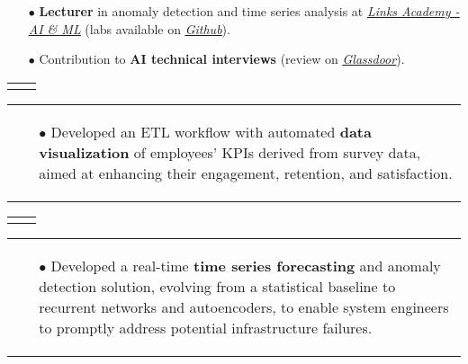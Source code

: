 \documentclass[11pt,a4paper,sans,english]{moderncv}
\makeatletter
\renewcommand*{\cventry}[6][.25em]{%
	\vspace{1.5mm}%
	\begin{tabular*}{\textwidth}{@{\extracolsep{\fill}}ll}%
		\ifthenelse{\equal{#3}{}}{}{\textbf{#3}} &
		\ifthenelse{\equal{#2}{}}{}{#4 #6 #2}\\%
	\end{tabular*}%
	\par\addvspace{#1}}
\newcommand*{\mycvitem}[2][.25em]{%
	\vspace{-.25em}%
	\begin{tabular}{@{}p{\textwidth}@{}}%
		\small#2%
	\end{tabular}%
	\par\addvspace{-0.7em}}
\newcommand*{\cvtag}[1]{%
	\textcolor{lightgray!50!black}{\fbox{\mathstrut\scriptsize\textsf{\textbf{#1}}}}}
\makeatother
\begin{document}
{\begin{itemize}
			\item[$\bullet$] \textbf{Lecturer} in anomaly detection  and time series analysis at \href{https://academy.linksmt.it/corso-di-formazione-post-laurea-artificial-intelligence-machine-learning/}{\textit{\underline{Links Academy - AI \& ML}}} (labs available on \href{https://github.com/francesco-s/Links-Academy---Anomaly-Detection-Time-series-analysis}{\textit{\underline{Github}}}).
			\item[$\bullet$] Contribution to \textbf{AI technical interviews} (review on \href{https://www.glassdoor.it/Colloquio/Links-Management-and-Technology-Colloquio-RVW82686296.htm}{\textit{\underline{Glassdoor}}}).
	\end{itemize}}
	\vspace*{.25cm}
	
	\cventry{\scalebox{0.9}{\faCalendar\ 10/2022--02/2023}}{Artificial Intelligence and Data - Analyst}{\scalebox{0.9}{\faBuilding\ \href{https://www2.deloitte.com}{\textit{Deloitte}}}}{}{\scalebox{0.9}{\faMapMarker\ Bari}}{}
	\mycvitem{%
		\vspace*{-.6cm}
		\begin{flushleft}
			\noindent
			\cvtag{Qlik Sense} \cvtag{SQL} \cvtag{MS Excel} \cvtag{Qlik NPrinting}
		\end{flushleft}
		\vspace*{-.2cm}
		\begin{itemize}
			\item[$\bullet$] Developed an ETL workflow with automated \textbf{data visualization} of employees' KPIs derived from survey data, aimed at enhancing their engagement, retention, and satisfaction.
	\end{itemize}}
	
	\vspace*{.25cm}
	\cventry{\scalebox{0.9}{\faCalendar\ 12/2021--05/2022}}{AI engineer and System Administrator - Intern}{\scalebox{0.9}{\faBuilding\ \href{https://www.intesasanpaolo.com/}{\textit{Intesa Sanpaolo}}}}{}{\scalebox{0.9}{\faMapMarker\ Torino}}{}
	\mycvitem{%
		\vspace*{-.6cm}
		\begin{flushleft}
			\noindent
			\cvtag{Python} \cvtag{Tensorflow} \cvtag{Google Cloud Platform} \cvtag{Flask} \cvtag{Bokeh} \cvtag{Bash}
		\end{flushleft}
		\vspace*{-.2cm}
		\begin{itemize}
			\item[$\bullet$] Developed a real-time \textbf{time series forecasting} and anomaly detection solution, evolving from a statistical baseline to recurrent networks and autoencoders, to enable system engineers to promptly address potential infrastructure failures.
	\end{itemize}}
	
\end{document}
